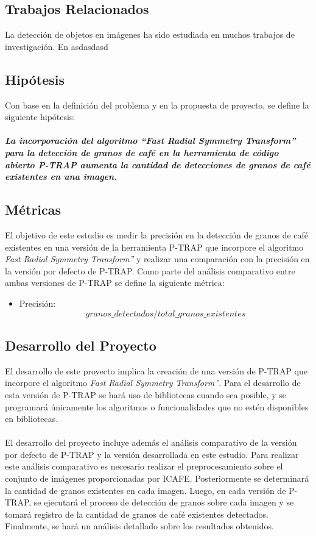 \subsection{Trabajos Relacionados}
La detecci\'on de objetos en im\'agenes ha sido estudiada en muchos trabajos de investigaci\'on.
En \cite{montgomeryx} asdasdasd

\subsection{Hip\'otesis}
Con base en la definici\'on del problema y en la propuesta de proyecto, se define la siguiente hip\'otesis:\\\\
\textbf{\textit{La incorporaci\'on del algoritmo “Fast Radial Symmetry Transform”\cite{loyzelinsky} para la detecci\'on de granos de caf\'e en la herramienta de c\'odigo abierto P-TRAP\cite{ptrap} aumenta la cantidad de detecciones de granos de caf\'e existentes en una imagen.}} 
\subsection{M\'etricas} \label{metricas}
El objetivo de este estudio es medir la precisi\'on en la detecci\'on de granos de caf\'e existentes en una versi\'on de la herramienta P-TRAP\cite{ptrap} que incorpore el algoritmo \textit{Fast Radial Symmetry Transform”}\cite{loyzelinsky} y realizar una comparaci\'on con la precisi\'on en la versi\'on por defecto de P-TRAP\cite{ptrap}. Como parte del an\'alisis comparativo entre ambas versiones de P-TRAP\cite{ptrap} se define la siguiente m\'etrica:
\begin{itemize}
\item Precisi\'on: \[ granos\_detectados / total\_granos\_existentes \]
\end{itemize}
\subsection{Desarrollo del Proyecto}
El desarrollo de este proyecto implica la creaci\'on de una versi\'on de P-TRAP\cite{ptrap} que incorpore el algoritmo \textit{Fast Radial Symmetry Transform”}\cite{loyzelinsky}. Para el desarrollo de esta versi\'on de P-TRAP\cite{ptrap} se har\'a uso de bibliotecas cuando sea posible, y se programar\'a \'unicamente los algoritmos o funcionalidades que no est\'en disponibles en bibliotecas.
\\\\
El desarrollo del proyecto incluye adem\'as el an\'alisis comparativo de la versi\'on por defecto de P-TRAP\cite{ptrap} y la versi\'on desarrollada en este estudio. Para realizar este an\'alisis comparativo es necesario realizar el preprocesamiento sobre el conjunto de im\'agenes proporcionadas por ICAFE. Posteriormente se determinar\'a la cantidad de granos existentes en cada imagen. Luego, en cada versi\'on de P-TRAP\cite{ptrap}, se ejecutar\'a el proceso de detecci\'on de granos sobre cada imagen y se tomar\'a registro de la cantidad de granos de caf\'e existentes detectados. Finalmente, se har\'a un an\'alisis detallado sobre los resultados obtenidos.